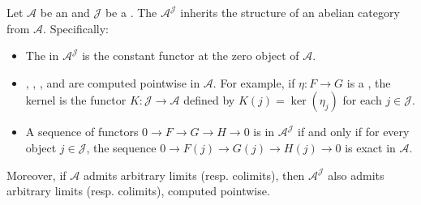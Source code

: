 \begin{theorem} \label{theorem:functor_category_of_an_abelian_category_indexed_by_a_small_category_is_abelian}
    Let $\mathcal{A}$ be an  and $\mathcal{J}$ be a . The  $\mathcal{A}^{\mathcal{J}}$ inherits the structure of an abelian category from $\mathcal{A}$. Specifically:
    \begin{itemize}
        \item The  in $\mathcal{A}^{\mathcal{J}}$ is the constant functor at the zero object of $\mathcal{A}$.
        \item {}, , , and  are computed pointwise in $\mathcal{A}$. For example, if $\eta: F \to G$ is a , the kernel is the functor $K: \mathcal{J} \to \mathcal{A}$ defined by $K(j) = \ker(\eta_j)$ for each $j \in \mathcal{J}$.
        \item A sequence of functors $0 \to F \to G \to H \to 0$ is  in $\mathcal{A}^{\mathcal{J}}$ if and only if for every object $j \in \mathcal{J}$, the sequence $0 \to F(j) \to G(j) \to H(j) \to 0$ is exact in $\mathcal{A}$.
    \end{itemize}
    Moreover, if $\mathcal{A}$ admits arbitrary limits (resp. colimits), then $\mathcal{A}^{\mathcal{J}}$ also admits arbitrary limits (resp. colimits), computed pointwise.
\end{theorem}
